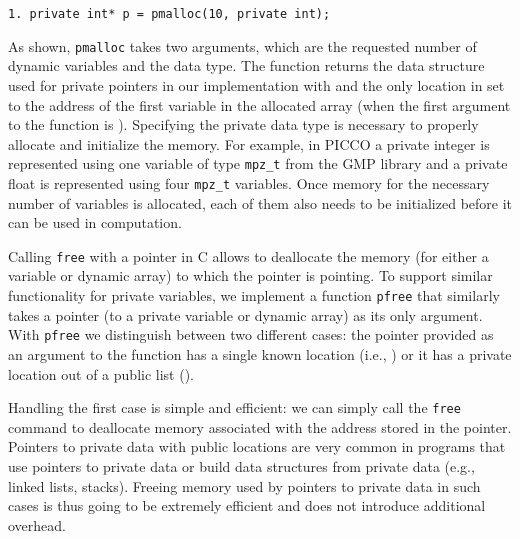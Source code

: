 \documentclass[11pt]{article}
\begin{document}
{\small \begin{verbatim}
1. private int* p = pmalloc(10, private int);
\end{verbatim}}
\noindent As shown, \texttt{pmalloc} takes two arguments,
which are the requested number of dynamic variables and the data type. The
function returns the data structure used for private pointers in our
implementation with  and the only location in  set to the
address of the first variable in the allocated array (when the first
argument to the function is ). Specifying the private data type is
necessary to properly allocate and initialize the memory. For example, in
PICCO a private integer is represented using one variable of type
\texttt{mpz\_t} from the GMP library \cite{gmp} and a private float is
represented using four \texttt{mpz\_t} variables. Once memory for the
necessary number of variables is allocated, each of them also needs to be
initialized before it can be used in computation.

Calling \texttt{free} with a pointer in C allows to deallocate the memory
(for either a variable or dynamic array) to which the pointer is pointing.
To support similar functionality for private variables, we implement a
function \texttt{pfree} that similarly takes a pointer (to a private
variable or dynamic array) as its only argument. With \texttt{pfree} we
distinguish between two different cases: the pointer provided as an argument
to the function has a single known location (i.e., ) or it has a
private location out of a public list ().

Handling the first case is simple and efficient: we can simply call the
\texttt{free} command to deallocate memory associated with the address
stored in the pointer. Pointers to private data with public locations are
very common in programs that use pointers to private data or build data
structures from private data (e.g., linked lists, stacks). Freeing memory
used by pointers to private data in such cases is thus going to be extremely
efficient and does not introduce additional overhead. 
\end{document}
